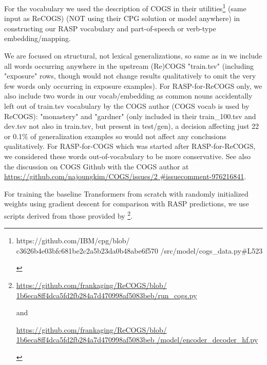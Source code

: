 \documentclass[11pt]{article}
\begin{document}
For the vocabulary we used the \citep{klinger2024compositionalprogramgenerationfewshot} description of COGS in their utilities\footnote{\begin{footnotesize}https://github.com/IBM/cpg/blob/
c3626b4e03bfc681be2c2a5b23da0b48abe6f570
/src/model/cogs\_data.py\#L523\end{footnotesize}} (same input as ReCOGS) (NOT using their CPG solution or model anywhere) in constructing our RASP vocabulary and part-of-speech or verb-type embedding/mapping. 

We are focused on structural, not lexical generalizations, so same as in \citep{klinger2024compositionalprogramgenerationfewshot} we include all words occurring anywhere in the upstream (Re)COGS "train.tsv" (including "exposure" rows, though would not change results qualitatively to omit the very few words only occurring in exposure examples). For RASP-for-ReCOGS only, we also include two words in our vocab/embedding as common nouns accidentally left out of train.tsv vocabulary by the COGS author (COGS vocab is used by ReCOGS): "monastery" and "gardner" (only included in their train\_100.tsv and dev.tsv not also in train.tsv, but present in test/gen), a decision affecting just 22 or 0.1\% of generalization examples so would not affect any conclusions qualitatively. For RASP-for-COGS which was started after RASP-for-ReCOGS, we considered these words out-of-vocabulary to be more conservative. See also the discussion on COGS Github with the COGS author at \href{https://github.com/najoungkim/COGS/issues/2\#issuecomment-976216841}{https://github.com/najoungkim/COGS/issues/2
\#issuecomment-976216841}.

For training the baseline Transformers from scratch with randomly initialized weights using gradient descent for comparison with RASP predictions, we use scripts derived from those provided by \citep{Wu2023}\footnote{\begin{footnotesize}\href{https://github.com/frankaging/ReCOGS/blob/1b6eca8ff4dca5fd2fb284a7d470998af5083beb/run\_cogs.py}{https://github.com/frankaging/ReCOGS/blob/
1b6eca8ff4dca5fd2fb284a7d470998af5083beb/run\_cogs.py}

and

\href{https://github.com/frankaging/ReCOGS/blob/1b6eca8ff4dca5fd2fb284a7d470998af5083beb/model/encoder\_decoder\_hf.py}{https://github.com/frankaging/ReCOGS/blob/
1b6eca8ff4dca5fd2fb284a7d470998af5083beb
/model/encoder\_decoder\_hf.py}\end{footnotesize}}.
\end{document}
